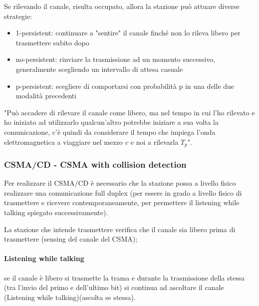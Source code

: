 Se rilevando il canale, risulta occupato, allora la stazione può attuare diverse strategie: 
\begin{itemize}
    \item 1-persistent:  continuare a "sentire" il canale finché non lo rileva libero per trasmettere subito dopo
    \item no-persistent: rinviare la trasmissione ad un momento successivo, generalmente scegliendo un intervallo di attesa casuale
    \item p-persistent: scegliere di comportarsi con probabilità p in una delle due modalità precedenti
\end{itemize}
"Può accadere di rilevare il canale come libero, ma nel tempo in cui l'ho rilevato e ho iniziato ad utilizzarlo qualcun'altro potrebbe iniziare a sua volta la comunicazione, c'è quindi da considerare il tempo che impiega l'onda elettromagnetica a viaggiare nel mezzo $v$ e noi a rilevarla $T_p$".

\subsubsection{CSMA/CD - CSMA with collision detection}
Per realizzare il CSMA/CD è necessario che la stazione possa a livello fisico
realizzare una comunicazione full duplex (per essere in grado a livello fisico di
trasmettere e ricevere contemporaneamente, per permettere il listening while talking spiegato successivamente).

La stazione che intende trasmettere verifica che il canale sia libero prima di
trasmettere (sensing del canale del CSMA); 
\paragraph{Listening while talking}
se il canale è libero si trasmette la trama e durante la trasmissione della stessa
(tra l'invio del primo e dell'ultimo bit) si continua ad ascoltare il canale (Listening
while talking)(ascolta se stessa).



